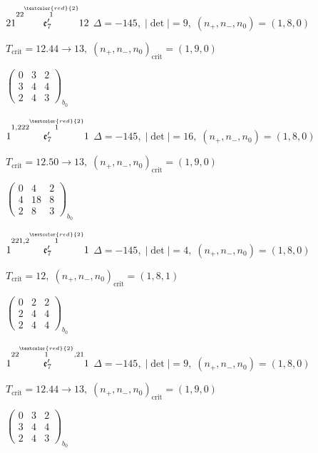 \documentclass[10pt]{article}
\begin{document}
$21\overset{22\overset{\textcolor{red}{2}}{1}}{\mathfrak{e}_7'}12$ \quad $\Delta=-145,\; |\det|=9,\; (n_+,n_-,n_0)=(1,8,0)$

\hspace{1em}$T_{\text{crit}}=12.44 \to 13,\; (n_+,n_-,n_0)_{\text{crit}}=(1,9,0)$

\hspace{2em}$\left(\begin{smallmatrix}0 & 3 & 2 \\ 3 & 4 & 4 \\ 2 & 4 & 3\end{smallmatrix}\right)_{\!b_0}$

\smallskip

$1\overset{1,222\overset{\textcolor{red}{2}}{1}}{\mathfrak{e}_7'}1$ \quad $\Delta=-145,\; |\det|=16,\; (n_+,n_-,n_0)=(1,8,0)$

\hspace{1em}$T_{\text{crit}}=12.50 \to 13,\; (n_+,n_-,n_0)_{\text{crit}}=(1,9,0)$

\hspace{2em}$\left(\begin{smallmatrix}0 & 4 & 2 \\ 4 & 18 & 8 \\ 2 & 8 & 3\end{smallmatrix}\right)_{\!b_0}$

\smallskip

$1\overset{221,2\overset{\textcolor{red}{2}}{1}}{\mathfrak{e}_7'}1$ \quad $\Delta=-145,\; |\det|=4,\; (n_+,n_-,n_0)=(1,8,0)$

\hspace{1em}$T_{\text{crit}}=12,\; (n_+,n_-,n_0)_{\text{crit}}=(1,8,1)$

\hspace{2em}$\left(\begin{smallmatrix}0 & 2 & 2 \\ 2 & 4 & 4 \\ 2 & 4 & 4\end{smallmatrix}\right)_{\!b_0}$

$1\overset{22\overset{\textcolor{red}{2}}{1},21}{\mathfrak{e}_7'}1$ \quad $\Delta=-145,\; |\det|=9,\; (n_+,n_-,n_0)=(1,8,0)$

\hspace{1em}$T_{\text{crit}}=12.44 \to 13,\; (n_+,n_-,n_0)_{\text{crit}}=(1,9,0)$

\hspace{2em}$\left(\begin{smallmatrix}0 & 3 & 2 \\ 3 & 4 & 4 \\ 2 & 4 & 3\end{smallmatrix}\right)_{\!b_0}$
\end{document}
